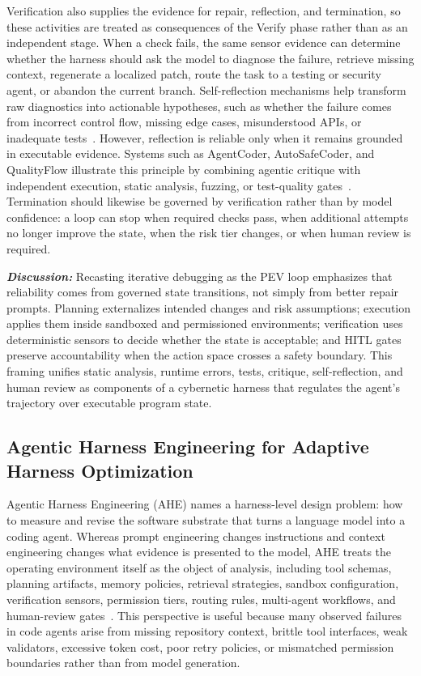 \documentclass{llmxive}
\begin{document}
Verification also supplies the evidence for repair, reflection, and termination, so these activities are treated as consequences of the Verify phase rather than as an independent stage. When a check fails, the same sensor evidence can determine whether the harness should ask the model to diagnose the failure, retrieve missing context, regenerate a localized patch, route the task to a testing or security agent, or abandon the current branch. Self-reflection mechanisms help transform raw diagnostics into actionable hypotheses, such as whether the failure comes from incorrect control flow, missing edge cases, misunderstood APIs, or inadequate tests~\cite{Wu2025IterPrefFP, Pan2025CodeCoR}. However, reflection is reliable only when it remains grounded in executable evidence. Systems such as AgentCoder, AutoSafeCoder, and QualityFlow illustrate this principle by combining agentic critique with independent execution, static analysis, fuzzing, or test-quality gates~\cite{huang2023agentcoder, Nunez2024AutoSafeCoder, Hu2025QualityFlow}. Termination should likewise be governed by verification rather than by model confidence: a loop can stop when required checks pass, when additional attempts no longer improve the state, when the risk tier changes, or when human review is required.

\textbf{\textit{Discussion:}} Recasting iterative debugging as the PEV loop emphasizes that reliability comes from governed state transitions, not simply from better repair prompts. Planning externalizes intended changes and risk assumptions; execution applies them inside sandboxed and permissioned environments; verification uses deterministic sensors to decide whether the state is acceptable; and HITL gates preserve accountability when the action space crosses a safety boundary. This framing unifies static analysis, runtime errors, tests, critique, self-reflection, and human review as components of a cybernetic harness that regulates the agent's trajectory over executable program state.


\subsection{Agentic Harness Engineering for Adaptive Harness Optimization}
\label{sec:ahe}



Agentic Harness Engineering (AHE) names a harness-level design problem: how to measure and revise the software substrate that turns a language model into a coding agent. Whereas prompt engineering changes instructions and context engineering changes what evidence is presented to the model, AHE treats the operating environment itself as the object of analysis, including tool schemas, planning artifacts, memory policies, retrieval strategies, sandbox configuration, verification sensors, permission tiers, routing rules, multi-agent workflows, and human-review gates~\cite{lin2026agentic, zhou2026externalization}. This perspective is useful because many observed failures in code agents arise from missing repository context, brittle tool interfaces, weak validators, excessive token cost, poor retry policies, or mismatched permission boundaries rather than from model generation.
\end{document}
